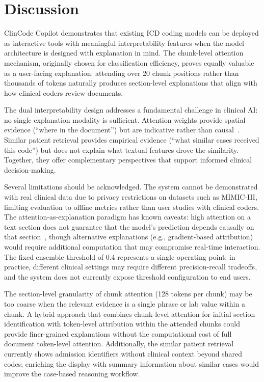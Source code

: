 \documentclass[conference]{IEEEtran}
\begin{document}
\section{Discussion}

ClinCode Copilot demonstrates that existing ICD coding models can be deployed as interactive tools with meaningful interpretability features when the model architecture is designed with explanation in mind. The chunk-level attention mechanism, originally chosen for classification efficiency, proves equally valuable as a user-facing explanation: attending over 20 chunk positions rather than thousands of tokens naturally produces section-level explanations that align with how clinical coders review documents.

The dual interpretability design addresses a fundamental challenge in clinical AI: no single explanation modality is sufficient. Attention weights provide spatial evidence (``where in the document'') but are indicative rather than causal~\cite{b_jain2019, b_wiegreffe2019}. Similar patient retrieval provides empirical evidence (``what similar cases received this code'') but does not explain what textual features drove the similarity. Together, they offer complementary perspectives that support informed clinical decision-making.

Several limitations should be acknowledged. The system cannot be demonstrated with real clinical data due to privacy restrictions on datasets such as MIMIC-III, limiting evaluation to offline metrics rather than user studies with clinical coders. The attention-as-explanation paradigm has known caveats: high attention on a text section does not guarantee that the model's prediction depends causally on that section~\cite{b_jain2019}, though alternative explanations (e.g., gradient-based attribution) would require additional computation that may compromise real-time interaction. The fixed ensemble threshold of 0.4 represents a single operating point; in practice, different clinical settings may require different precision-recall tradeoffs, and the system does not currently expose threshold configuration to end users.

The section-level granularity of chunk attention (128 tokens per chunk) may be too coarse when the relevant evidence is a single phrase or lab value within a chunk. A hybrid approach that combines chunk-level attention for initial section identification with token-level attribution within the attended chunks could provide finer-grained explanations without the computational cost of full document token-level attention. Additionally, the similar patient retrieval currently shows admission identifiers without clinical context beyond shared codes; enriching the display with summary information about similar cases would improve the case-based reasoning workflow.
\end{document}
